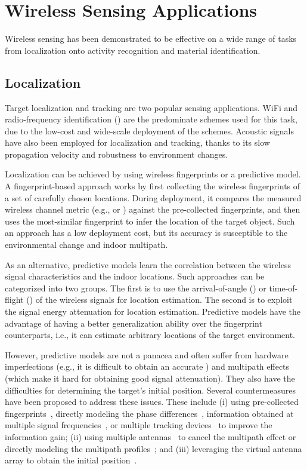 \section{Wireless Sensing Applications}
Wireless sensing has been demonstrated to be effective on a wide range of tasks from localization onto activity recognition and material
identification.


\subsection{Localization} Target localization and tracking are two popular sensing applications. WiFi and radio-frequency
identification (\RFID) are the predominate schemes used for this task, due to the low-cost and wide-scale deployment of the schemes.
Acoustic signals have also been employed for localization and tracking, thanks to its slow propagation velocity and robustness to
environment changes.

 Localization can be achieved by using wireless fingerprints or a predictive model. A fingerprint-based approach works
by first collecting the wireless fingerprints of a set of carefully chosen locations. During deployment, it compares the measured wireless
channel metric (e.g., \RSSI or \CSI) against the pre-collected fingerprints, and then uses the most-similar fingerprint to infer the
location of the target object. Such an approach has a low deployment cost, but its accuracy is susceptible to the environmental change and
indoor multipath.

As an alternative, predictive models learn the correlation between the wireless signal characteristics and the indoor locations. Such
approaches can be categorized into two groups. The first is to use the arrival-of-angle (\AoA) or time-of-flight (\TOF) of the wireless
signals for location estimation. The second is to exploit the signal energy attenuation for location estimation. Predictive models have the
advantage of having a better generalization ability over the fingerprint counterparts, i.e., it can estimate arbitrary locations of the
target environment.

However, predictive models are not a panacea and often suffer from hardware imperfections (e.g., it is difficult to obtain an accurate
\TOF) and multipath effects (which make it hard for obtaining good signal attenuation). They also have the difficulties for determining the
target's initial position. Several countermeasures have been proposed to address these issues. These include (i) using pre-collected
fingerprints~\cite{Wang2016D}, directly modeling the phase differences~\cite{LLAP},  information obtained at multiple signal
frequencies~\cite{RFind, CAT, Strata}, or multiple tracking devices~\cite{BeepBeep} to improve the information gain; (ii) using multiple
antennas~\cite{Arraytrack, Spotfi} to cancel the multipath effect or directly modeling the multipath profiles~\cite{PinIt}; and (iii)
leveraging the virtual antenna array to obtain the initial position~\cite{Tagoram}.

